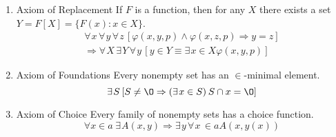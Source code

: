 \documentclass[12pt]{article}
\begin{document}
\begin{enumerate}
\item {\color{blue}Axiom of Replacement} If $F$ is a function, then for any $X$ there exists a set $Y = F[X] = \{F(x): x \in X\}$.
\begin{equation}
\begin{split}
	\forall \hspace{1pt} x  \hspace{2pt}  
	\forall \hspace{1pt} y  \hspace{2pt}  
	\forall \hspace{1pt} z  \hspace{2pt}  
	[\varphi (x, y, p) \land \varphi (x, z, p) \Rightarrow y = z] 
	\\ \Rightarrow
	\forall \hspace{1pt} X  \hspace{2pt}  
	\exists \hspace{1pt} Y  \hspace{2pt}  
	\forall \hspace{1pt} y  \hspace{2pt}  
	[y \in Y \equiv \exists \hspace{1pt} x \in X \varphi (x, y, p)]
\end{split}
\end{equation}


\item {\color{blue}Axiom of Foundations} Every nonempty set has an $\in$-minimal element.
\begin{equation}
	\exists \hspace{1pt} S \hspace{2pt}  
	[ S \neq \O \Rightarrow 
	(\exists \hspace{1pt} x  \in S)
	\hspace{2pt}  S  \cap x = \O ]
\end{equation}


\item {\color{blue}Axiom of Choice}  Every family of nonempty sets has a choice function.
\begin{equation}
	\forall x  \in a \hspace{3pt}  
	\exists \hspace{1pt} A(x,y) \Rightarrow 
	\exists \hspace{1pt} y  \hspace{2pt}  
	\forall \hspace{1pt} x \hspace{2pt} 
	\in a A(x, y(x))
\end{equation}

\end{enumerate}
\end{document}

